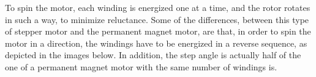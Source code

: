 \begin{figure}[htp]
    \centering
    \hfill
\end{figure}

To spin the motor, each winding is energized one at a time, and the rotor rotates in such a way, to minimize reluctance. Some of the differences, between this type of stepper motor and the permanent magnet motor, are that, in order to spin the motor in a direction, the windings have to be energized in a reverse sequence, as depicted in the images below. In addition, the step angle is actually half of the one of a permanent magnet motor with the same number of windings is.

